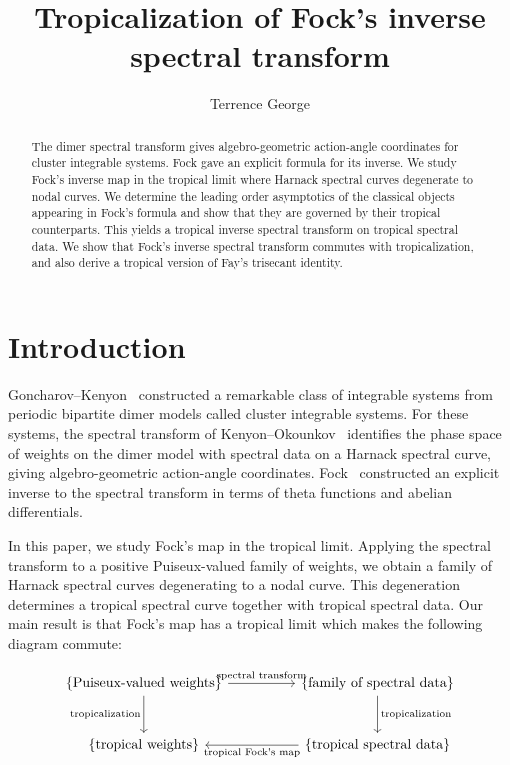 \documentclass[12pt]{amsart}
\numberwithin{equation}{section}
\theoremstyle{definition}
\begin{document}
	
	\title{Tropicalization of Fock's inverse spectral transform}


  \author{Terrence George}
\address{
Tata Institute of Fundamental Research-Centre for Applicable Mathematics
}
	\date{}
	
\begin{abstract}
The dimer spectral transform gives algebro-geometric action-angle coordinates for cluster integrable systems. Fock gave an explicit formula for its inverse. We study Fock's inverse map in the tropical limit where Harnack spectral curves degenerate to nodal curves. We determine the leading order asymptotics of the classical objects appearing in Fock's formula and show that they are governed by their tropical counterparts. This yields a tropical inverse spectral transform on tropical spectral data. We show that Fock's inverse spectral transform commutes with tropicalization, and also derive a tropical version of Fay's trisecant identity.
\end{abstract}


	\maketitle

\section{Introduction}

 Goncharov--Kenyon~\cite{GK} constructed a remarkable class of integrable systems from periodic bipartite dimer models called cluster integrable systems. For these systems, the spectral transform of Kenyon--Okounkov~\cite{KO07b} identifies the phase space of weights on the dimer model with spectral data on a Harnack spectral curve, giving algebro-geometric action-angle coordinates. Fock~\cite{Fock} constructed an explicit inverse to the spectral transform in terms of theta functions and abelian differentials. 

In this paper, we study Fock's map in the tropical limit. Applying the spectral transform to a positive Puiseux-valued family of weights, we obtain a family of Harnack spectral curves degenerating to a nodal curve. This degeneration determines a tropical spectral curve together with tropical spectral data. Our main result is that Fock's map has a tropical limit which makes the following diagram commute:

\[
\begin{tikzcd}[column sep=huge,row sep=large]
\left\{
\text{Puiseux-valued weights}
\right\}
\arrow[r,"\text{spectral transform}"]
\arrow[d,"\operatorname{tropicalization}"']
&
\{
\text{family of spectral data}
\}
\arrow[d,"\operatorname{tropicalization}"]
\\
\{
\text{tropical weights}
\}
&
\{
\text{tropical spectral data}
\}
\arrow[l,"\text{tropical Fock's map}"]
\end{tikzcd}
\]
\end{document}
